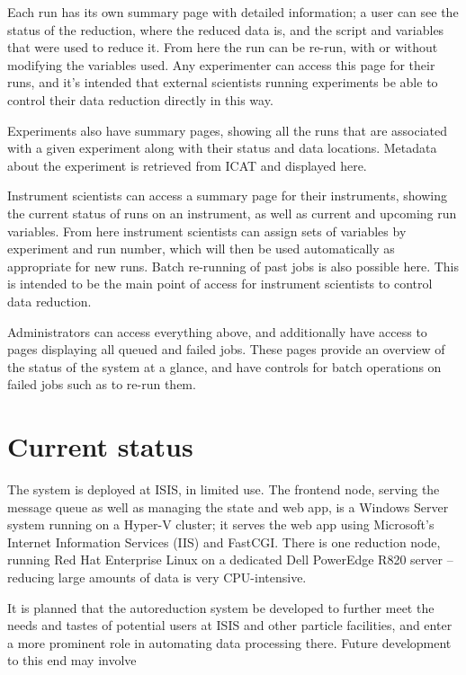 \documentclass[twocolumn]{article}
\begin{document}
Each run has its own summary page with detailed information; a user can
see the status of the reduction, where the reduced data is, and the
script and variables that were used to reduce it. From here the run can
be re-run, with or without modifying the variables used. Any
experimenter can access this page for their runs, and it's intended that
external scientists running experiments be able to control their data
reduction directly in this way.

Experiments also have summary pages, showing all the runs that are
associated with a given experiment along with their status and data
locations. Metadata about the experiment is retrieved from ICAT and
displayed here.

Instrument scientists can access a summary page for their instruments,
showing the current status of runs on an instrument, as well as current
and upcoming run variables. From here instrument scientists can assign
sets of variables by experiment and run number, which will then be used
automatically as appropriate for new runs. Batch re-running of past jobs
is also possible here. This is intended to be the main point of access
for instrument scientists to control data reduction.

Administrators can access everything above, and additionally have access
to pages displaying all queued and failed jobs. These pages provide an
overview of the status of the system at a glance, and have controls for
batch operations on failed jobs such as to re-run them.

\section{Current status}\label{current-status}

The system is deployed at ISIS, in limited use. The frontend node,
serving the message queue as well as managing the state and web app, is
a Windows Server system running on a Hyper-V cluster; it serves the web
app using Microsoft's Internet Information Services (IIS) and FastCGI.
There is one reduction node, running Red Hat Enterprise Linux on a
dedicated Dell PowerEdge R820 server -- reducing large amounts of data
is very CPU-intensive.

It is planned that the autoreduction system be developed to further meet
the needs and tastes of potential users at ISIS and other particle
facilities, and enter a more prominent role in automating data
processing there. Future development to this end may involve
\end{document}
